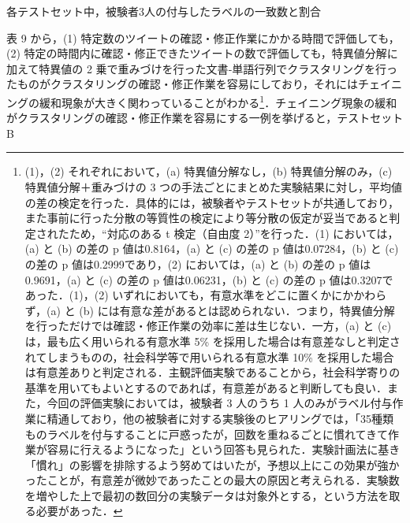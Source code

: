 \documentclass[japanese]{jnlp_1.4}
\begin{document}
\begin{table}[t]
\caption{各テストセット中，被験者3人の付与したラベルの一致数と割合}

\end{table}

表 9 から，(1) 特定数のツイートの確認・修正作業にかかる時間で評価しても，(2) 特定の時間内に確認・修正できたツイートの数で評価しても，特異値分解に加えて特異値の 2 乗で重みづけを行った文書‐単語行列でクラスタリングを行ったものがクラスタリングの確認・修正作業を容易にしており，それにはチェイニングの緩和現象が大きく関わっていることがわかる\footnote{(1)，(2) それぞれにおいて，(a) 特異値分解なし，(b) 特異値分解のみ，(c) 特異値分解＋重みづけの 3 つの手法ごとにまとめた実験結果に対し，平均値の差の検定を行った．具体的には，被験者やテストセットが共通しており，また事前に行った分散の等質性の検定により等分散の仮定が妥当であると判定されたため，``対応のある t 検定（自由度 2）''を行った．(1) においては，(a) と (b) の差の p 値は0.8164，(a) と (c) の差の p 値は0.07284，(b) と (c) の差の p 値は0.2999であり，(2) においては，(a) と (b) の差の p 値は0.9691，(a) と (c) の差の p 値は0.06231，(b) と (c) の差の p 値は0.3207であった．(1)，(2) いずれにおいても，有意水準をどこに置くかにかかわらず，(a) と (b) には有意な差があるとは認められない．つまり，特異値分解を行っただけでは確認・修正作業の効率に差は生じない．一方，(a) と (c) は，最も広く用いられる有意水準 5\% を採用した場合は有意差なしと判定されてしまうものの，社会科学等で用いられる有意水準 10\% を採用した場合は有意差ありと判定される．主観評価実験であることから，社会科学寄りの基準を用いてもよいとするのであれば，有意差があると判断しても良い．また，今回の評価実験においては，被験者 3 人のうち 1 人のみがラベル付与作業に精通しており，他の被験者に対する実験後のヒアリングでは，「35種類ものラベルを付与することに戸惑ったが，回数を重ねるごとに慣れてきて作業が容易に行えるようになった」という回答も見られた．実験計画法に基き「慣れ」の影響を排除するよう努めてはいたが，予想以上にこの効果が強かったことが，有意差が微妙であったことの最大の原因と考えられる．実験数を増やした上で最初の数回分の実験データは対象外とする，という方法を取る必要があった．}．チェイニング現象の緩和がクラスタリングの確認・修正作業を容易にする一例を挙げると，テストセット B 
\end{document}
